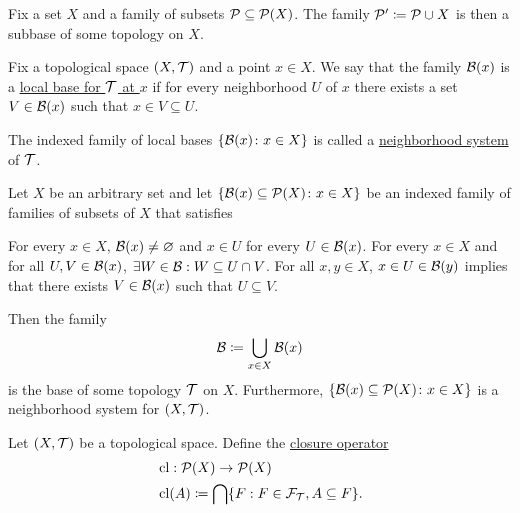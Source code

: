 \begin{proposition}
  Fix a set $X$ and a family of subsets $\mathcal P \subseteq \operatorname{\mathcal P}(X)$. The family $\mathcal P' \coloneqq \mathcal P \cup X$ is then a subbase of some topology on $X$.
\end{proposition}

\begin{definition}\label{def:topological_local_base}\cite[12]{Engelking1989}
  Fix a topological space $(X, \mathcal T)$ and a point $x \in X$. We say that the family $\mathcal B(x)$ is a \uline{local base for $\mathcal T$ at $x$} if for every neighborhood $U$ of $x$ there exists a set $V \in \mathcal B(x)$ such that $x \in V \subseteq U$.

  The indexed family of local bases $\{ \mathcal B(x) \colon x \in X \}$ is called a \uline{neighborhood system} of $\mathcal T$.
\end{definition}

\begin{proposition}\label{thm:topological_local_base_axioms}\cite[13]{Engelking1989}
  Let $X$ be an arbitrary set and let $\{ \mathcal B(x) \subseteq \operatorname{\mathcal P}(X) \colon x \in X \}$ be an indexed family of families of subsets of $X$ that satisfies
  \begin{description}
     For every $x \in X$, $\mathcal B(x) \neq \varnothing$ and $x \in U$ for every $U \in \mathcal B(x)$.
     For every $x \in X$ and for all $U, V \in \mathcal B(x)$, $\exists W \in \mathcal B: W \subseteq U \cap V$.
     For all $x, y \in X$, $x \in U \in \mathcal B(y)$ implies that there exists $V \in \mathcal B(x)$ such that $U \subseteq V$.
  \end{description}

  Then the family
  \begin{align*}
    \mathcal B \coloneqq \bigcup_{x \in X} \mathcal B(x)
  \end{align*}
  is the base of some topology $\mathcal T$ on $X$. Furthermore, $\{ \mathcal B(x) \subseteq \operatorname{\mathcal P}(X) \colon x \in X \}$ is a neighborhood system for $(X, \mathcal T)$.
\end{proposition}

\begin{definition}\label{def:closure_operator}\cite[33]{Engelking1989}
  Let $(X, \mathcal T)$ be a topological space. Define the \uline{closure operator}
  \begin{align*}
    &\operatorname{cl}: \operatorname{\mathcal P}(X) \to \operatorname{\mathcal P}(X) \\
    &\operatorname{cl}(A) \coloneqq \bigcap \{ F : F \in \mathcal F_{\mathcal T}, A \subseteq F \}.
  \end{align*}
\end{definition}

